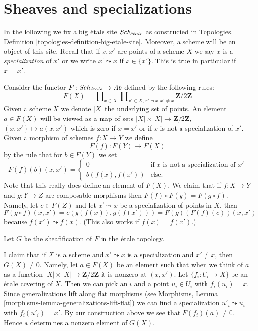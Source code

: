 \section{Sheaves and specializations}
\label{section-sheaves}

\noindent
In the following we fix a big \'etale site $\mathit{Sch}_{\acute{e}tale}$
as constructed in
Topologies, Definition \ref{topologies-definition-big-etale-site}.
Moreover, a scheme will be an object of this site.
Recall that if $x, x'$ are points of a scheme $X$ we say $x$ is a
{\it specialization} of $x'$ or we write $x' \leadsto x$ if
$x \in \overline{\{x'\}}$. This is true in particular if $x = x'$.

\medskip\noindent
Consider the functor $F : \mathit{Sch}_{\acute{e}tale} \to \textit{Ab}$
defined by the following rules:
$$
F(X) = \prod\nolimits_{x \in X}
\prod\nolimits_{x' \in X, x' \leadsto x, x' \not = x}
\mathbf{Z}/2\mathbf{Z}
$$
Given a scheme $X$ we denote $|X|$ the underlying set of points.
An element $a \in F(X)$ will be viewed as a map of sets
$|X| \times |X| \to \mathbf{Z}/2\mathbf{Z}$, $(x, x') \mapsto a(x, x')$
which is zero if $x = x'$ or if $x$ is not a specialization of $x'$.
Given a morphism of schemes $f : X \to Y$ we define
$$
F(f) : F(Y) \longrightarrow F(X)
$$
by the rule that for $b \in F(Y)$ we set
$$
F(f)(b)(x, x') =
\left\{
\begin{matrix}
0 & \text{if }x\text{ is not a specialization of }x' \\
b(f(x), f(x')) & \text{else.}
\end{matrix}
\right.
$$
Note that this really does define an element of $F(X)$. We claim that if
$f : X \to Y$ and $g : Y \to Z$ are composable morphisms then
$F(f) \circ F(g) = F(g \circ f)$. Namely, let $c \in F(Z)$ and let
$x' \leadsto x$ be a specialization of points in $X$, then
$$
F(g \circ f)(x, x') = c(g(f(x)), g(f(x'))) = F(g)(F(f)(c))(x, x')
$$
because $f(x') \leadsto f(x)$. (This also works if $f(x) = f(x')$.)

\medskip\noindent
Let $G$ be the sheafification of $F$ in the \'etale topology.

\medskip\noindent
I claim that if $X$ is a scheme and $x' \leadsto x$ is a specialization
and $x' \not = x$, then $G(X) \not = 0$. Namely, let $a \in F(X)$ be
an element such that when we think of $a$ as a function
$|X| \times |X| \to \mathbf{Z}/2\mathbf{Z}$ it is nonzero at $(x, x')$.
Let $\{f_i : U_i \to X\}$ be an \'etale covering of $X$. Then we can pick an
$i$ and a point $u_i \in U_i$ with $f_i(u_i) = x$. Since generalizations
lift along flat morphisms (see
Morphisms, Lemma \ref{morphisms-lemma-generalizations-lift-flat})
we can find a specialization $u'_i \leadsto u_i$
with $f_i(u'_i) = x'$. By our construction above we see that
$F(f_i)(a) \not = 0$. Hence $a$ determines a nonzero element of $G(X)$.


